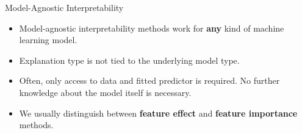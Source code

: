 \documentclass[11pt,compress,t,notes=noshow, xcolor=table]{beamer}
\begin{document}
\begin{vbframe}{Model-Agnostic Interpretability}
 \begin{itemize}
  \itemsep2em
  \item Model-agnostic interpretability methods work for \textbf{any} kind of machine learning model.
  \item Explanation type is not tied to the underlying model type.
  \item Often, only access to data and fitted predictor is required. No further knowledge about the model itself is necessary.
  \item We usually distinguish between \textbf{feature effect} and \textbf{feature importance} methods.
 \end{itemize}
\end{vbframe}
\end{document}
